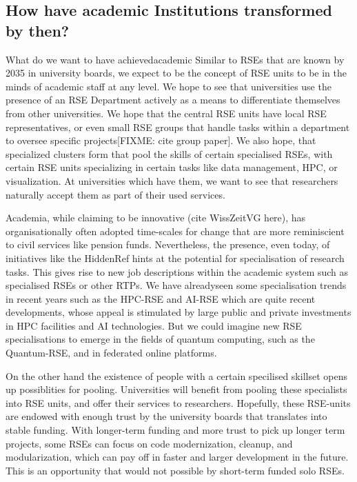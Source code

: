 \documentclass{eceasst}
\begin{document}
\subsection{How have academic Institutions transformed by then?}
\begin{whatis}{What do we want to have achieved}{academic}
Similar to RSEs that are known by 2035 in university boards, we expect to be the concept of RSE units to be in the minds
of academic staff at any level.
We hope to see that universities use the presence of an RSE Department actively as a means to differentiate themselves from other universities.
We hope that the central RSE units have local RSE representatives, or even small RSE groups that handle tasks within a department to oversee specific projects[FIXME: cite group paper].
We also hope, that specialized clusters form that pool the skills of certain specialised RSEs, with certain RSE units specializing in certain tasks like data management, HPC, or visualization.
At universities which have them, we want to see that researchers naturally accept them as part of their used services.
\end{whatis}
Academia, while claiming to be innovative (cite WissZeitVG here), has organisationally often adopted time-scales for change that are more reminiscient to civil services like pension funds.
Nevertheless, the presence, even today, of initiatives like the HiddenRef hints at the potential for specialisation of research tasks. This gives rise to new job descriptions within the academic system such as specialised RSEs or other RTPs.
We have alreadyseen some specialisation trends in recent years such as
the HPC-RSE and AI-RSE which are quite recent developments, whose appeal is stimulated by large public and private investments in HPC facilities and AI technologies.
But we could imagine new RSE specialisations to emerge in the fields
of quantum computing, such as the Quantum-RSE, and in federated online platforms.

On the other hand the existence of people with a certain specilised skillset opens up possiblities for pooling.
Universities will benefit from pooling these specialists into RSE units, and offer their services to researchers.
Hopefully, these RSE-units are endowed with enough trust by the university boards that translates into stable funding.
With longer-term funding and more trust to pick up longer term projects,
some RSEs can focus on code modernization, cleanup, and modularization,
which can pay off in faster and larger development in the future.
This is an opportunity that would not possible by short-term funded solo RSEs.
\end{document}
